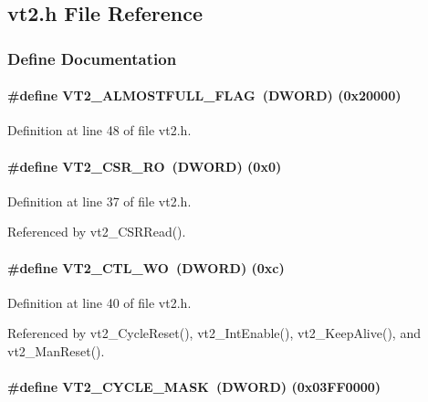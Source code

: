 \subsection{vt2.h File Reference}
\label{vt2_8h}


\subsubsection{Define Documentation}
\paragraph[{VT2\_\-ALMOSTFULL\_\-FLAG}]{\setlength{\rightskip}{0pt plus 5cm}\#define VT2\_\-ALMOSTFULL\_\-FLAG~({\bf DWORD}) (0x20000)}\hfill\label{vt2_8h_a2273cbf169a9e5044e7e6bfed06d6fb5}


Definition at line 48 of file vt2.h.
\paragraph[{VT2\_\-CSR\_\-RO}]{\setlength{\rightskip}{0pt plus 5cm}\#define VT2\_\-CSR\_\-RO~({\bf DWORD}) (0x0)}\hfill\label{vt2_8h_ac0dc030d91bda22506598220d7bb1a8f}


Definition at line 37 of file vt2.h.

Referenced by vt2\_\-CSRRead().
\paragraph[{VT2\_\-CTL\_\-WO}]{\setlength{\rightskip}{0pt plus 5cm}\#define VT2\_\-CTL\_\-WO~({\bf DWORD}) (0xc)}\hfill\label{vt2_8h_a72a69f7c89d401521253d460e706e544}


Definition at line 40 of file vt2.h.

Referenced by vt2\_\-CycleReset(), vt2\_\-IntEnable(), vt2\_\-KeepAlive(), and vt2\_\-ManReset().
\paragraph[{VT2\_\-CYCLE\_\-MASK}]{\setlength{\rightskip}{0pt plus 5cm}\#define VT2\_\-CYCLE\_\-MASK~({\bf DWORD}) (0x03FF0000)}\hfill\label{vt2_8h_a23209c771f0df8a93ff0c03e542e6cfd}



